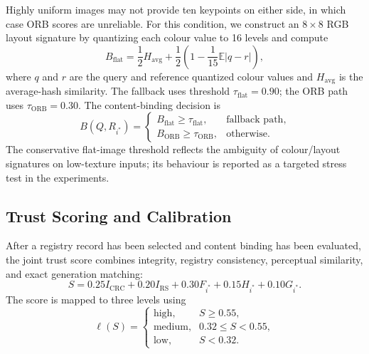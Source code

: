 \documentclass[a4paper,fleqn]{cas-sc}
\begin{document}
Highly uniform images may not provide ten keypoints on either side, in which
case ORB scores are unreliable. For this condition, we construct an
$8\times8$ RGB layout signature by quantizing each colour value to 16 levels
and compute
\begin{equation}
  B_{\mathrm{flat}}
  =\frac{1}{2}H_{\mathrm{avg}}
  +\frac{1}{2}\left(1-\frac{1}{15}\mathbb{E}|q-r|\right),
  \label{eq:flat-score}
\end{equation}
where $q$ and $r$ are the query and reference quantized colour values and
$H_{\mathrm{avg}}$ is the average-hash similarity. The fallback uses threshold
$\tau_{\mathrm{flat}}=0.90$; the ORB path uses
$\tau_{\mathrm{ORB}}=0.30$. The content-binding decision is
\begin{equation}
  B(Q,R_{i^*})=
  \begin{cases}
    B_{\mathrm{flat}}\ge\tau_{\mathrm{flat}}, & \text{fallback path},\\
    B_{\mathrm{ORB}}\ge\tau_{\mathrm{ORB}}, & \text{otherwise}.
  \end{cases}
  \label{eq:content-binding-gate}
\end{equation}
The conservative flat-image threshold reflects the ambiguity of colour/layout
signatures on low-texture inputs; its behaviour is reported as a targeted
stress test in the experiments.

\subsection{Trust Scoring and Calibration}
After a registry record has been selected and content binding has been
evaluated, the joint trust score combines integrity, registry consistency,
perceptual similarity, and exact generation matching:
\begin{equation}
  S
  =0.25I_{\mathrm{CRC}}
  +0.20I_{\mathrm{RS}}
  +0.30F_{i^*}
  +0.15H_{i^*}
  +0.10G_{i^*}.
  \label{eq:trust-score}
\end{equation}
The score is mapped to three levels using
\begin{equation}
  \ell(S)=
  \begin{cases}
    \text{high}, & S\ge0.55,\\
    \text{medium}, & 0.32\le S<0.55,\\
    \text{low}, & S<0.32.
  \end{cases}
  \label{eq:trust-levels}
\end{equation}
\end{document}
